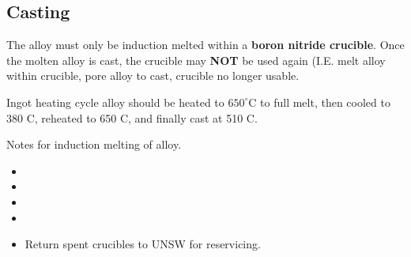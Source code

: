 \subsection{Casting}

The \MgZnCa alloy must only be induction melted within a \textbf{boron nitride crucible}. Once the molten alloy is cast, the crucible may \textbf{NOT} be used again (I.E. melt alloy within crucible, pore alloy to cast, crucible no longer usable. 

Ingot heating cycle
\MgZnCa alloy should be heated to $650^{\circ}$C to full melt, then cooled to 380 C, reheated to 650 C, and finally cast at 510 C. 

Notes for induction melting of \MgZnCa alloy.
\begin{itemize}
\item 
\item 
\item 
\item
\item Return spent crucibles to UNSW for reservicing. 
\end{itemize}